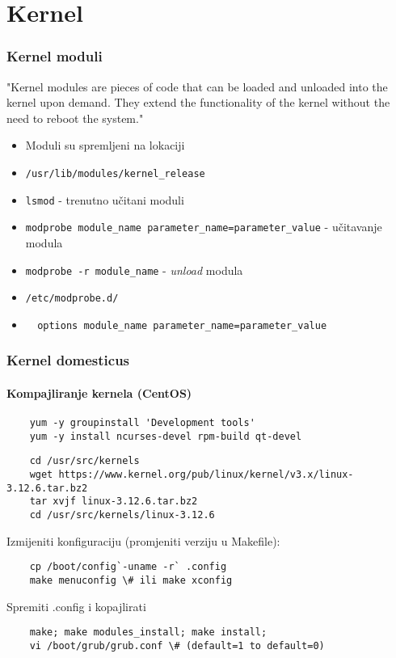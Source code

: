 \documentclass[t]{beamer}
\begin{document}
\section{Kernel}
\begin{frame}[fragile]
	\frametitle{Kernel moduli}
	"Kernel modules are pieces of code that can be loaded and unloaded into the kernel upon demand. They extend the functionality of the kernel without the need to reboot the system."
	\begin{itemize}
		\item Moduli su spremljeni na lokaciji
		\item[] \verb|/usr/lib/modules/kernel_release|
	\end{itemize}
	\begin{itemize}
		\item \texttt{lsmod} - trenutno učitani moduli
		\item \texttt{modprobe module\_name parameter\_name=parameter\_value} - učitavanje modula
		\item \texttt{modprobe -r module\_name} - \textit{unload} modula
	\end{itemize}
	\begin{itemize}
		\item[] \verb|/etc/modprobe.d/|
		\item[] \verb|  options module_name parameter_name=parameter_value|
	\end{itemize}
\end{frame}



\begin{frame}[fragile]
	\frametitle{Kernel domesticus}
	\framesubtitle{Kompajliranje kernela (CentOS)}
    \footnotesize
    \begin{verbatim}
	yum -y groupinstall 'Development tools'
	yum -y install ncurses-devel rpm-build qt-devel
	\end{verbatim}
	\begin{verbatim}
	cd /usr/src/kernels
	wget https://www.kernel.org/pub/linux/kernel/v3.x/linux-3.12.6.tar.bz2
	tar xvjf linux-3.12.6.tar.bz2
	cd /usr/src/kernels/linux-3.12.6
	\end{verbatim}
	Izmijeniti konfiguraciju (promjeniti verziju u Makefile):
	\begin{verbatim}
	cp /boot/config`-uname -r` .config
	make menuconfig \# ili make xconfig
	\end{verbatim}
	Spremiti .config i kopajlirati
	\begin{verbatim}
	make; make modules_install; make install;
	vi /boot/grub/grub.conf \# (default=1 to default=0)
	\end{verbatim}
\end{frame}
\end{document}
